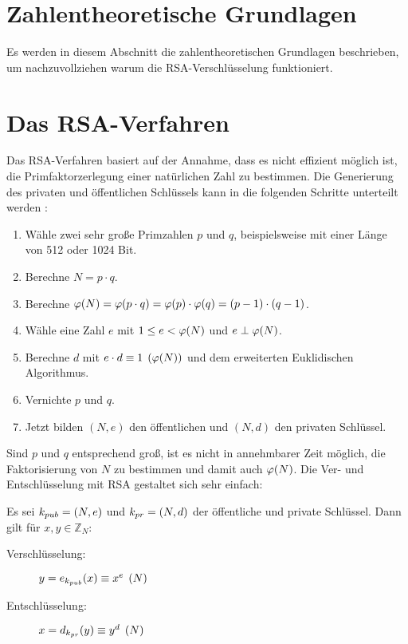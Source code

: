 \section{Zahlentheoretische Grundlagen}
Es werden in diesem Abschnitt die zahlentheoretischen Grundlagen beschrieben,
um nachzuvollziehen warum die RSA-Verschlüsselung funktioniert.







\section{Das RSA-Verfahren}
Das RSA-Verfahren basiert auf der Annahme, dass es nicht effizient
möglich ist, die Primfaktorzerlegung einer natürlichen Zahl zu bestimmen.
Die Generierung des privaten und öffentlichen Schlüssels kann in die
folgenden Schritte unterteilt werden \parencite[176]{BOOK:crypto}:
\newpage

\begin{definition}\mbox{}
  \begin{enumerate}
    \item Wähle zwei sehr große Primzahlen $p$ und $q$, beispielsweise mit einer
          Länge von 512 oder 1024 Bit.
    \item Berechne $N = p \cdot q$.
    \item Berechne $\varphi(N) = \varphi(p \cdot q) = \varphi(p) \cdot \varphi(q) = (p-1) \cdot (q-1)$.
    \item Wähle eine Zahl $e$ mit $1 \leq e < \varphi(N)$ und $e \perp \varphi(N)$.
    \item Berechne $d$ mit $e \cdot d \equiv 1 \pod{\varphi(N)}$ und dem erweiterten
          Euklidischen Algorithmus.
    \item Vernichte $p$ und $q$.
    \item Jetzt bilden $(N,e)$ den öffentlichen und $(N,d)$ den privaten Schlüssel.
  \end{enumerate}
\end{definition}

\noindent
Sind $p$ und $q$ entsprechend groß, ist es nicht in annehmbarer Zeit möglich, die Faktorisierung
von $N$ zu bestimmen und damit auch $\varphi(N)$. Die Ver- und Entschlüsselung mit RSA
gestaltet sich sehr einfach:

\begin{definition}
  Es sei $k_{pub} = (N,e)$ und $k_{pr} = (N,d)$ der öffentliche und private Schlüssel.
  Dann gilt für $x,y \in \mathbb{Z}_N$:
  \begin{description}
    \item[Verschlüsselung:] $y = e_{k_{pub}}(x) \equiv x^e \pod{N}$
    \item[Entschlüsselung:] $x = d_{k_{pr}}(y) \equiv y^d \pod{N}$
  \end{description}
\end{definition}

